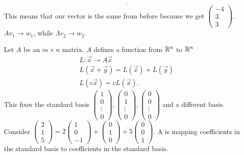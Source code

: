 \begin{eg}
\[  .\] 
  This means that our vector is the same from before because we get $\begin{pmatrix} -4\\3\\3 \end{pmatrix} $.\newline
  $Av_1\to w_1$, while $\Lambda v_2\to w_2$.
\end{eg}


Let $A$ be an $m\times n$ matrix. $A$ defines a function from $\mathbb{R}^{n}$ to $\mathbb{R}^{n}$
\begin{align*}
  L:\vec{x}\to A\vec{x}\\
  L(\vec{x}+\vec{y})=L(\vec{x})+L(\vec{y})\\
  L(c\vec{x})=cL(\vec{x})
.\end{align*}
This fixes the standard basis $\begin{pmatrix} 1\\0\\ \vdots\\0 \end{pmatrix},\begin{pmatrix} 0\\1\\ \vdots \\0 \end{pmatrix}, \begin{pmatrix} 0\\0\\ \vdots \\0 \end{pmatrix}   $ and a different basis. Consider $\begin{pmatrix} 2\\1\\5 \end{pmatrix} = 2\begin{pmatrix} 1\\0\\-1 \end{pmatrix} + \begin{pmatrix} 0\\1\\0 \end{pmatrix} +5\begin{pmatrix} 0\\0\\1 \end{pmatrix}  $. A is mapping coefficients in the standard basis to coefficients in the standard basis.

